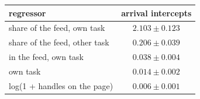 \begin{tabular}{lc}
\toprule
regressor & arrival intercepts \\
\midrule
share of the feed, own task & $2.103 \pm 0.123$ \\
share of the feed, other task & $0.206 \pm 0.039$ \\
in the feed, own task & $0.038 \pm 0.004$ \\
own task & $0.014 \pm 0.002$ \\
log(1 + handles on the page) & $0.006 \pm 0.001$ \\
\bottomrule
\end{tabular}
